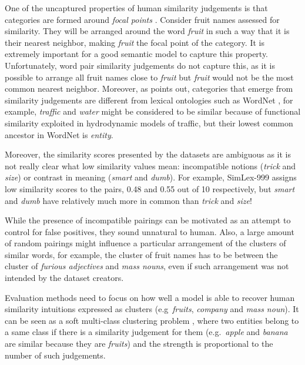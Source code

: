 \documentclass[11pt]{article}
\begin{document}
One of the uncaptured properties of human similarity judgements is that categories are formed around \emph{focal points} \cite{1986-13502-00119860101}. Consider fruit names assessed for similarity. They will be arranged around the word \textit{fruit} in such a way that it is their nearest neighbor, making \textit{fruit} the focal point of the category. It is extremely important for a good semantic model to capture this property. Unfortunately, word pair similarity judgements do not capture this, as it is possible to arrange all fruit names close to \textit{fruit} but \textit{fruit} would not be the most common nearest neighbor. Moreover, as  points out, categories that emerge from similarity judgements are different from lexical ontologies such as WordNet \cite{Miller:1995:WLD:219717.219748}, for example, \textit{traffic} and \textit{water} might be considered to be similar because of functional similarity exploited in hydrodynamic models of traffic, but their lowest common ancestor in WordNet is \textit{entity}.

Moreover, the similarity scores presented by the datasets are ambiguous as it is not really clear what low similarity values mean: incompatible notions (\textit{trick} and \textit{size}) or contrast in meaning (\textit{smart} and \textit{dumb}). For example, SimLex-999 assigns low similarity scores to the pairs, 0.48 and 0.55 out of 10 respectively, but \textit{smart} and \textit{dumb} have relatively much more in common than \textit{trick} and \textit{size}!

While the presence of incompatible pairings can be motivated as an attempt to control for false positives, they sound unnatural to human. Also, a large amount of random pairings\footnotemark{} might influence a particular arrangement of the clusters of similar words, for example, the cluster of fruit names has to be between the cluster of \textit{furious adjectives} and \textit{mass nouns}, even if such arrangement was not intended by the dataset creators.

Evaluation methods need to focus on how well a model is able to recover human similarity intuitions expressed as clusters (e.g~\textit{fruits}, \textit{company} and \textit{mass noun}). It can be seen as a soft multi-class clustering problem \cite{White:2015:WSE:2838931.2838932}, where two entities belong to a same class if there is a similarity judgement for them (e.g.~\textit{apple} and \textit{banana} are similar because they are \textit{fruits}) and the strength is proportional to the number of such judgements.
\end{document}
